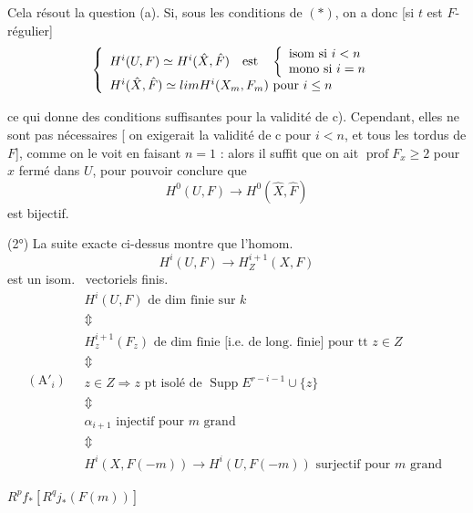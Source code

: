 \documentclass[11pt,a4paper]{article}
\begin{document}
Cela résout la question (a). Si, sous les conditions de $(*)$, on a donc [si $t$ est $F$-régulier]
\[
\left\lbrace
\begin{array}{l}
  H^i(U, F) \simeq H^i(\hat{X}, \hat{F}) \quad \text{est} \quad
  \left\lbrace
  \begin{array}{l}
    \text{isom si } i < n \\
    \text{mono si } i = n
  \end{array}
  \right. \\[1ex]
  H^i(\hat{X}, \hat{F}) \simeq \varprojlim H^i(X_m, F_m) \text{ pour } i \leq n
\end{array}
\right.
\]

ce qui donne des conditions suffisantes pour la validité de c). Cependant, elles ne sont pas nécessaires [ on exigerait la validité de c pour $i < n$, et tous les tordus de $F$], comme on le voit en faisant $n = 1$ : alors il suffit que on ait $\operatorname{prof} F_x \geq 2$ pour $x$ fermé dans $U$, pour pouvoir conclure que
\[
  H^0(U, F) \longrightarrow H^0(\hat{X}, \hat{F})
\]
est bijectif.

(2°) La suite exacte ci-dessus montre que l'homom.
\[
  H^i(U, F) \longrightarrow H^{i+1}_Z(X, F)
\]
est un isom.\  vectoriels finis.  
\[
(\mathrm{A}'_i) \quad
\left.
\begin{array}{l}
  H^i(U, F) \text{ de dim finie sur } k \\
  \Updownarrow \\
  H^{i+1}_z(F_z) \text{ de dim finie [i.e.\ de long.\ finie] pour tt } z \in Z \\
  \Updownarrow \\
  z \in Z \Rightarrow z \text{ pt isolé de } \operatorname{Supp} E^{r-i-1} \cup \lbrace z \rbrace \\
  \Updownarrow \\
  \alpha_{i+1} \text{ injectif pour } m \text{ grand} \\
  \Updownarrow \\
  H^i(X, F(-m)) \to H^i(U, F(-m)) \text{ surjectif pour } m \text{ grand}
\end{array}
\right.
\]

$R^p f_* [R^q j_* (F(m))]$
\end{document}

